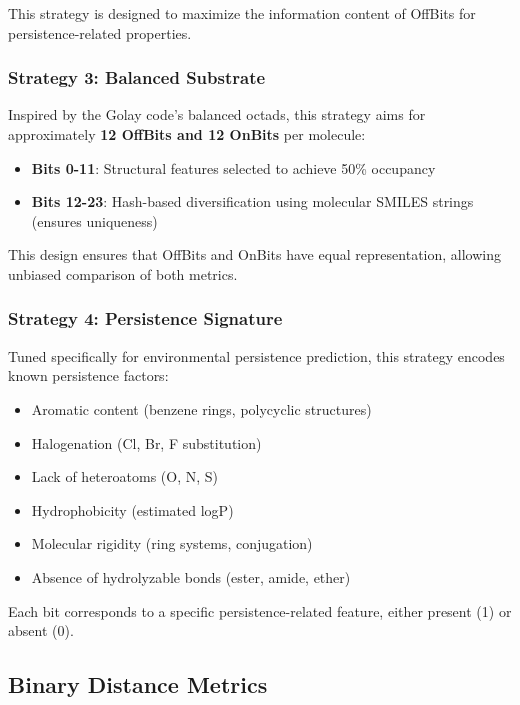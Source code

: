 \documentclass[11pt,letterpaper]{article}
\begin{document}
This strategy is designed to maximize the information content of OffBits for persistence-related properties.

\subsubsection{Strategy 3: Balanced Substrate}

Inspired by the Golay code's balanced octads, this strategy aims for approximately \textbf{12 OffBits and 12 OnBits} per molecule:

\begin{itemize}
    \item \textbf{Bits 0-11}: Structural features selected to achieve 50\% occupancy
    \item \textbf{Bits 12-23}: Hash-based diversification using molecular SMILES strings (ensures uniqueness)
\end{itemize}

This design ensures that OffBits and OnBits have equal representation, allowing unbiased comparison of both metrics.

\subsubsection{Strategy 4: Persistence Signature}

Tuned specifically for environmental persistence prediction, this strategy encodes known persistence factors:

\begin{itemize}
    \item Aromatic content (benzene rings, polycyclic structures)
    \item Halogenation (Cl, Br, F substitution)
    \item Lack of heteroatoms (O, N, S)
    \item Hydrophobicity (estimated logP)
    \item Molecular rigidity (ring systems, conjugation)
    \item Absence of hydrolyzable bonds (ester, amide, ether)
\end{itemize}

Each bit corresponds to a specific persistence-related feature, either present (1) or absent (0).

\subsection{Binary Distance Metrics}
\end{document}
